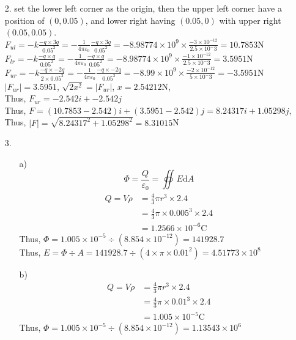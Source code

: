 \documentclass{article}
\begin{document}
\begin{itemize}
\newpage
\item[2.] set the lower left corner as the origin, then the upper left corner have a position of \((0,0.05)\), and lower right having \((0.05,0)\) with upper right \((0.05,0.05)\). 
\\\(F_{ul} = -k\frac{-q\times3q}{0.05^2}=-\frac{1}{4\pi\varepsilon_0}\frac{-q\times3q}{0.05^2}=-8.98774\times10^9\times\frac{-3\times10^{-12}}{2.5\times10^-3}=10.7853\)N
\\\(F_{lr} = -k\frac{-q\times q}{0.05^2}=-\frac{1}{4\pi\varepsilon_0}\frac{-q\times q}{0.05^2}=-8.98774\times10^9\times\frac{-1\times10^{-12}}{2.5\times10^-3}=3.5951\)N
\\\(F_{ur} = -k\frac{-q\times-2q}{2\times0.05^2}=-\frac{1}{4\pi\varepsilon_0}\frac{-q\times-2q}{0.05^2}=-8.99\times10^9\times\frac{-2\times10^{-12}}{5\times10^-3}=-3.5951\)N
\\\(|F_{ur}| = 3.5951\), \(\sqrt{2x^2} = |F_{ur}|\), \(x=2.54212\)N, \\Thus, \(F_{ur} = -2.542 i+-2.542 j\)
\\ Thus, \(F = (10.7853-2.542)i + (3.5951-2.542)j = 8.24317i+1.05298j\),
\\ Thus, \(|F| = \sqrt{8.24317^2+1.05298^2}=8.31015\)N
\item[3.]
\begin{itemize}
    \item [a)]
    \[\Phi = \frac{Q}{\varepsilon_0}=\oiint_{}^{} E\text{d}A\]
    \begin{align*}
        Q = V\rho &= \frac{4}{3}\pi r^3\times2.4\\
                    &= \frac{4}{3}\pi \times 0.005^3\times 2.4\\
                    &=1.2566 \times 10^{-6} \text{C}
    \end{align*}
    Thus, \(\Phi = 1.005\times10^{-5}\div(8.854\times10^{-12}) =141928.7 \)\\
    Thus, \(E = \Phi\div A = 141928.7 \div (4\times\pi\times0.01^2)=4.51773\times10^{8}\)
    \item [b)]
    \begin{align*}
        Q = V\rho &= \frac{4}{3}\pi r^3\times2.4\\
                    &= \frac{4}{3}\pi \times 0.01^3\times 2.4\\
                    &=1.005 \times 10^{-5} \text{C}
    \end{align*}
    Thus, \(\Phi = 1.005 \times10^{-5}\div(8.854\times10^{-12}) =1.13543 \times 10^{6} \)\\

\end{itemize}
\end{itemize}
\end{document}
